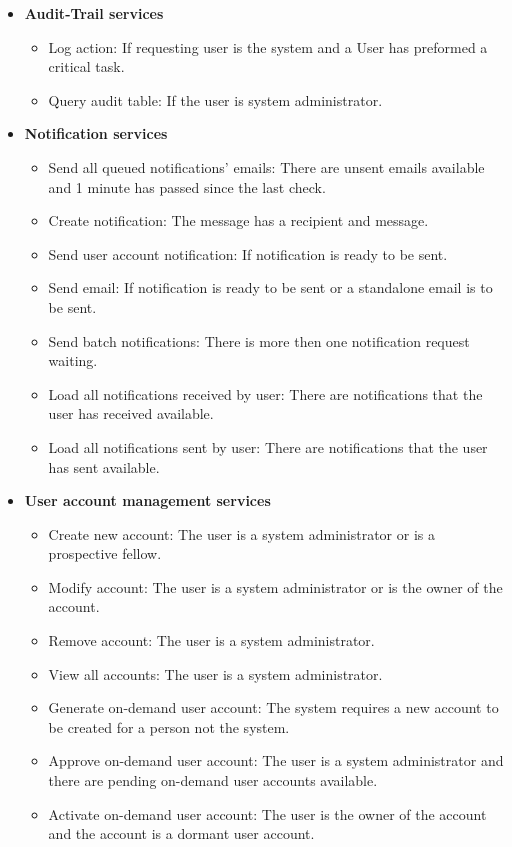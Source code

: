 \documentclass[12pt]{article}
\begin{document}
\begin{itemize}
	\item \textbf{Audit-Trail services}
		\begin{itemize}
			\item Log action: If requesting user is the system and a User has preformed a critical task.
			\item Query audit table: If the user is system administrator.										
		\end{itemize}
	
	\item \textbf{Notification services}
		\begin{itemize}
			\item Send all queued notifications' emails: There are unsent emails available and 1 minute has passed since the last check.
			\item Create notification: The message has a recipient and message.				
			\item Send user account notification: If notification is ready to be sent.
			\item Send email: If notification is ready to be sent or a standalone email is to be sent.
			\item Send batch notifications: There is more then one notification request waiting.
			\item Load all notifications received by user: There are notifications that the user has received available.
			\item Load all notifications sent by user: There are notifications that the user has sent available.	
		\end{itemize}
	
	\item \textbf{User account management services}
		\begin{itemize}
			\item Create new account: The user is a system administrator or is a prospective fellow.
			\item Modify account: The user is a system administrator or is the owner of the account.				
			\item Remove account: The user is a system administrator.	
			\item View all accounts: The user is a system administrator.
			\item Generate on-demand user account: The system requires a new account to be created for a person not the system.
			\item Approve on-demand user account: The user is a system administrator and there are pending on-demand user accounts available.
			\item Activate on-demand user account: The user is the owner of the account and the account is a dormant user account.				
		\end{itemize}
	

\end{itemize}
\end{document}

